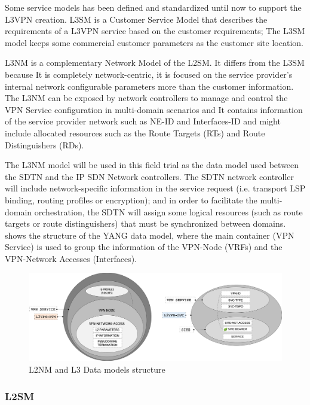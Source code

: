 \documentclass[a4paper,fleqn]{cas-dc}
\begin{document}
Some service models has been defined and standardized until now to support the L3VPN creation. L3SM \cite{rfc8299} is a Customer Service Model that describes the requirements of a L3VPN service based on the customer requirements; The L3SM model keeps some commercial customer parameters as the customer site location.

L3NM \cite{voyer2019internet} is a complementary Network Model of the L2SM. It differs from the L3SM because It is completely network-centric, it is focused on the service provider's internal network configurable parameters more than the customer information. The L3NM can be exposed by network controllers to manage and control the VPN Service configuration in multi-domain scenarios and It contains information of the service provider network such as NE-ID and Interfaces-ID and might include allocated resources such as the Route Targets (RTs) and Route Distinguishers (RDs).

The L3NM model will be used in this field trial as the data model used between the SDTN and the IP SDN Network controllers. The SDTN network controller will include network-specific information in the service request (i.e. transport LSP binding, routing profiles or encryption); and in order to facilitate the multi-domain orchestration, the SDTN will assign some logical resources (such as route targets or route distinguishers) that must be synchronized between domains.  shows the structure of the YANG data model, where the main container (VPN Service) is used to group the information of the VPN-Node (VRFs) and the VPN-Network Accesses (Interfaces).

\begin{figure}
	\centering
		\includegraphics[scale=0.35]{figs/L3NM_L2NM.png}
	\caption{L2NM and L3 Data models structure}
	\label{FIG:l3nm} 
\end{figure}

\subsubsection{L2SM}
\label{section:l2nm}
\end{document}
